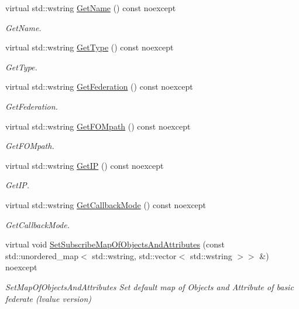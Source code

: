 \begin{DoxyCompactItemize}
virtual std\+::wstring \hyperlink{classUPIM_1_1UPIMFederate_a364723ba9d92457c6cef31ec9f1d970d}{Get\+Name} () const noexcept
\begin{DoxyCompactList}\small\item\em Get\+Name. \end{DoxyCompactList}\item 
virtual std\+::wstring \hyperlink{classUPIM_1_1UPIMFederate_ab8718d0463858475733af356731ad281}{Get\+Type} () const noexcept
\begin{DoxyCompactList}\small\item\em Get\+Type. \end{DoxyCompactList}\item 
virtual std\+::wstring \hyperlink{classUPIM_1_1UPIMFederate_ae2f19ca192c24de087801c5ac4cd9907}{Get\+Federation} () const noexcept
\begin{DoxyCompactList}\small\item\em Get\+Federation. \end{DoxyCompactList}\item 
virtual std\+::wstring \hyperlink{classUPIM_1_1UPIMFederate_ae95ca470376ff0be1bc3fed9b48336bb}{Get\+F\+O\+Mpath} () const noexcept
\begin{DoxyCompactList}\small\item\em Get\+F\+O\+Mpath. \end{DoxyCompactList}\item 
virtual std\+::wstring \hyperlink{classUPIM_1_1UPIMFederate_a23eaa38785be58ea9c3538e171f1114f}{Get\+IP} () const noexcept
\begin{DoxyCompactList}\small\item\em Get\+IP. \end{DoxyCompactList}\item 
virtual std\+::wstring \hyperlink{classUPIM_1_1UPIMFederate_ae864f66ca9b49b2be9c7ad15f8a0ddd0}{Get\+Callback\+Mode} () const noexcept
\begin{DoxyCompactList}\small\item\em Get\+Callback\+Mode. \end{DoxyCompactList}\item 
\mbox{\label{classUPIM_1_1UPIMFederate_a4bedec940b1344b55b93414e73ee4c0b}} 
virtual void \hyperlink{classUPIM_1_1UPIMFederate_a4bedec940b1344b55b93414e73ee4c0b}{Set\+Subscribe\+Map\+Of\+Objects\+And\+Attributes} (const std\+::unordered\+\_\+map$<$ std\+::wstring, std\+::vector$<$ std\+::wstring $>$$>$ \&) noexcept
\begin{DoxyCompactList}\small\item\em Set\+Map\+Of\+Objects\+And\+Attributes Set default map of Objects and Attribute of basic federate (lvalue version) \end{DoxyCompactList}\item 
$$
\end{DoxyCompactItemize}
